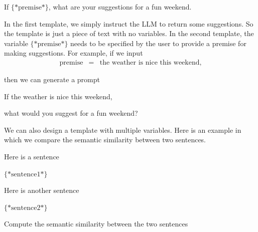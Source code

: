 \vspace{0.5em}
\begin{tcolorbox}

\hspace{2em} If $\{*\mathrm{premise}*\}$, what are your suggestions for a fun weekend.

\hspace{2em} \underline{\hspace{2em}}
\end{tcolorbox}
\vspace{0.5em}

In the first template, we simply instruct the LLM to return some suggestions. So the template is just a piece of text with no variables. In the second template, the variable $\{*\mathrm{premise}*\}$ needs to be specified by the user to provide a premise for making suggestions. For example, if we input
\begin{eqnarray}
\mathrm{premise} & = & \textrm{the weather is nice this weekend},
\end{eqnarray}

\noindent then we can generate a prompt

\vspace{0.5em}
\begin{tcolorbox}

\hspace{2em} If the weather is nice this weekend,

\hspace{2em} what would you suggest for a fun weekend?

\hspace{2em} \underline{\hspace{2em}}
\end{tcolorbox}
\vspace{0.5em}

We can also design a template with multiple variables. Here is an example in which we compare the semantic similarity between two sentences.

\vspace{0.5em}
\begin{tcolorbox}

\hspace{2em} Here is a sentence

\hspace{2em} $\{*\mathrm{sentence1}*\}$

\hspace{2em} Here is another sentence

\hspace{2em} $\{*\mathrm{sentence2}*\}$

\vspace{0.3em}

\hspace{2em} Compute the semantic similarity between the two sentences

\hspace{2em} \underline{\hspace{2em}}
\end{tcolorbox}
\vspace{0.5em}

